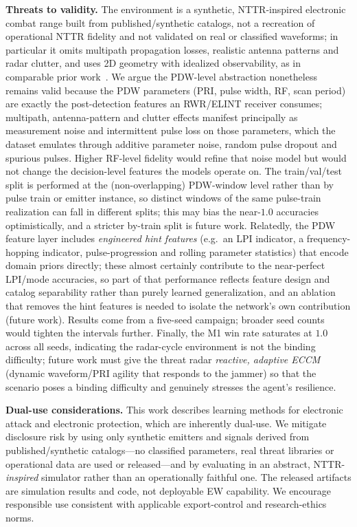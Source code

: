 \documentclass[journal]{IEEEtran}
\begin{document}
\textbf{Threats to validity.} The environment is a synthetic, NTTR-inspired electronic combat
range built from published/synthetic catalogs, not a recreation of operational NTTR fidelity and
not validated on real or classified waveforms; in particular it omits multipath propagation
losses, realistic antenna patterns and radar clutter, and uses 2D geometry with idealized
observability, as in comparable prior work~\cite{cai2025macjd}. We argue the PDW-level
abstraction nonetheless remains valid because the PDW parameters (PRI, pulse width, RF, scan
period) are exactly the post-detection features an RWR/ELINT receiver consumes; multipath,
antenna-pattern and clutter effects manifest principally as measurement noise and intermittent
pulse loss on those parameters, which the dataset emulates through additive parameter noise,
random pulse dropout and spurious pulses. Higher RF-level fidelity would refine that noise model
but would not change the decision-level features the models operate on. The train/val/test split is performed at the (non-overlapping) PDW-window level rather than by
pulse train or emitter instance, so distinct windows of the same pulse-train realization can fall
in different splits; this may bias the near-$1.0$ accuracies optimistically, and a stricter
by-train split is future work. Relatedly, the PDW feature layer includes \emph{engineered hint
features} (e.g.\ an LPI indicator, a frequency-hopping indicator, pulse-progression and rolling
parameter statistics) that encode domain priors directly; these almost certainly contribute to
the near-perfect LPI/mode accuracies, so part of that performance reflects feature design and
catalog separability rather than purely learned generalization, and an ablation that removes the
hint features is needed to isolate the network's own contribution (future work). Results come
from a five-seed campaign; broader seed counts would tighten the intervals further. Finally, the M1 win
rate saturates at $1.0$ across all seeds, indicating the radar-cycle environment is not the
binding difficulty; future work must give the threat radar \emph{reactive, adaptive ECCM}
(dynamic waveform/PRI agility that responds to the jammer) so that the scenario poses a binding
difficulty and genuinely stresses the agent's resilience.

\textbf{Dual-use considerations.} This work describes learning methods for electronic attack and
electronic protection, which are inherently dual-use. We mitigate disclosure risk by using only
synthetic emitters and signals derived from published/synthetic catalogs---no classified
parameters, real threat libraries or operational data are used or released---and by evaluating in
an abstract, NTTR-\emph{inspired} simulator rather than an operationally faithful one. The
released artifacts are simulation results and code, not deployable EW capability. We encourage
responsible use consistent with applicable export-control and research-ethics norms.
\end{document}
